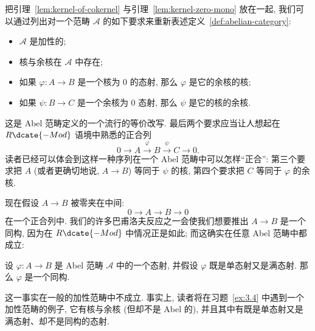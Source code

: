 \indent 把引理~\ref{lem:kernel-of-cokernel} 与引理~\ref{lem:kernel-zero-mono} 放在一起, 我们可以通过列出对一个范畴 $\mathcal{A}$ 的如下要求来重新表述定义~\ref{def:abelian-category}:
\begin{itemize}
\item $\mathcal{A}$ 是加性的;
\item 核与余核在 $\mathcal{A}$ 中存在;
\item 如果 $\varphi:A\to B$ 是一个核为 $0$ 的态射, 那么 $\varphi$ 是它的余核的核;
\item 如果 $\psi:B\to C$ 是一个余核为 $0$ 态射, 那么 $\psi$ 是它的核的余核.
\end{itemize}
这是 Abel 范畴定义的一个流行的等价改写. 最后两个要求应当让人想起在 $R\dcate{-Mod}$ 语境中熟悉的正合列
\[
0\longrightarrow A\xrightarrow{\varphi}B\xrightarrow{\psi}C\longrightarrow 0.
\]
读者已经可以体会到这样一种序列在一个 Abel 范畴中可以怎样``正合'': 第三个要求把 $A$ (或者更确切地说, $A\to B$) 等同于 $\psi$ 的核, 第四个要求把 $C$ 等同于 $\varphi$ 的余核.

\indent 现在假设 $A\to B$ 被零夹在中间:
\[
0\longrightarrow A\longrightarrow B\longrightarrow 0
\]
在一个正合列中. 我们的许多巴甫洛夫反应之一会使我们想要推出 $A\to B$ 是一个同构, 因为在 $R\dcate{-Mod}$ 中情况正是如此; 而这确实在任意 Abel 范畴中都成立:

\begin{lemma}\label{lem:mono-epi-iso}
设 $\varphi:A\to B$ 是 Abel 范畴 $\mathcal{A}$ 中的一个态射, 并假设 $\varphi$ 既是单态射又是满态射. 那么 $\varphi$ 是一个同构.
\end{lemma}

\begin{remark}\label{rmk:mono-epi-iso-general}
这一事实在一般的加性范畴中不成立. 事实上, 读者将在习题~\ref{ex:3.4} 中遇到一个加性范畴的例子, 它有核与余核 (但却不是 Abel 的), 并且其中有既是单态射又是满态射、却不是同构的态射.
\end{remark}

